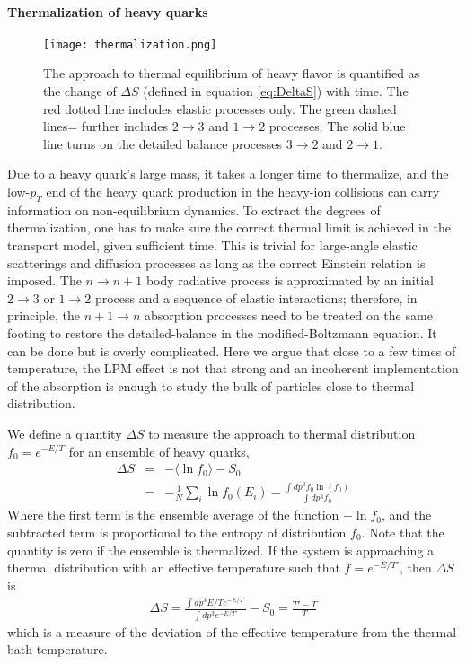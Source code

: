 \paragraph{Thermalization of heavy quarks}
\begin{figure}
\singlespacing
\centering
\texttt{[image: thermalization.png]}
\caption[The approach to thermal equilibrium of heavy flavor is quantified]{The approach to thermal equilibrium of heavy flavor is quantified as the change of $\Delta S$ (defined in equation \ref{eq:DeltaS}) with time. The red dotted line includes elastic processes only. The green dashed lines= further includes $2\rightarrow 3$ and $1\rightarrow 2$ processes. The solid blue line turns on the detailed balance processes $3\rightarrow 2$ and $2\rightarrow 1$.}
\label{fig:thermalization}
\end{figure}
Due to a heavy quark's large mass, it takes a longer time to thermalize, and the low-$p_T$ end of the heavy quark production in the heavy-ion collisions can carry information on non-equilibrium dynamics.
To extract the degrees of thermalization, one has to make sure the correct thermal limit is achieved in the transport model, given sufficient time.
This is trivial for large-angle elastic scatterings and diffusion processes as long as the correct Einstein relation is imposed.
The $n\rightarrow n+1$ body radiative process is approximated by an initial $2\rightarrow 3$ or $1\rightarrow 2$ process and a sequence of elastic interactions; therefore, in principle, the $n+1\rightarrow n$ absorption processes need to be treated on the same footing to restore the detailed-balance in the modified-Boltzmann equation.
It can be done but is overly complicated.
Here we argue that close to a few times of temperature, the LPM effect is not that strong and an incoherent implementation of the absorption is enough to study the bulk of particles close to thermal distribution.

We define a quantity $\Delta S$ to measure the approach to thermal distribution $f_0 = e^{-E/T}$ for an ensemble of heavy quarks,
\begin{eqnarray}
\Delta S &=& - \langle \ln f_0 \rangle - S_0 \\
 &=& - \frac{1}{N}\sum_i\ln f_0(E_i) - \frac{\int dp^3 f_0 \ln(f_0)}{\int dp^3 f_0}
 \label{eq:DeltaS}
\end{eqnarray}
Where the first term is the ensemble average of the function $-\ln f_0$, and the subtracted term is proportional to the entropy of distribution $f_0$.
Note that the quantity is zero if the ensemble is thermalized.
If the system is approaching a thermal distribution with an effective temperature such that $f = e^{-E/T'}$, then $\Delta S$ is 
\begin{eqnarray}
\Delta S = \frac{\int dp^3 E/T e^{-E/T'}}{\int dp^3 e^{-E/T'}} - S_0 = \frac{T'-T}{T}
\end{eqnarray}
which is a measure of the deviation of the effective temperature from the thermal bath temperature.

